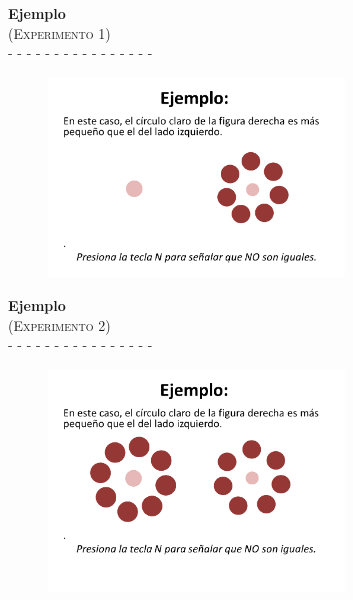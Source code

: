 \documentclass[a4paper ]{article}
\begin{document}
\begin{center}
{\LARGE \textbf{Ejemplo}}\\
{\large \textsc{(Experimento 1)}}\\
-  -  -  -  -  -  -  -  -  -  -  -  -  -  -  -
\smallskip
\end{center}
\vspace{3mm}
\begin{figure}[th]
\centering
\includegraphics[width=0.7\textwidth]{Figures/Inst_Ex} 
\end{figure}
\clearpage







\begin{center}
{\LARGE \textbf{Ejemplo}}\\
{\large \textsc{(Experimento 2)}}\\
-  -  -  -  -  -  -  -  -  -  -  -  -  -  -  -
\smallskip
\end{center}
\vspace{3mm}
\begin{figure}[th]
\centering
\includegraphics[width=0.7\textwidth]{Figures/Inst_Ex2} 
\end{figure}
\clearpage
\end{document}
